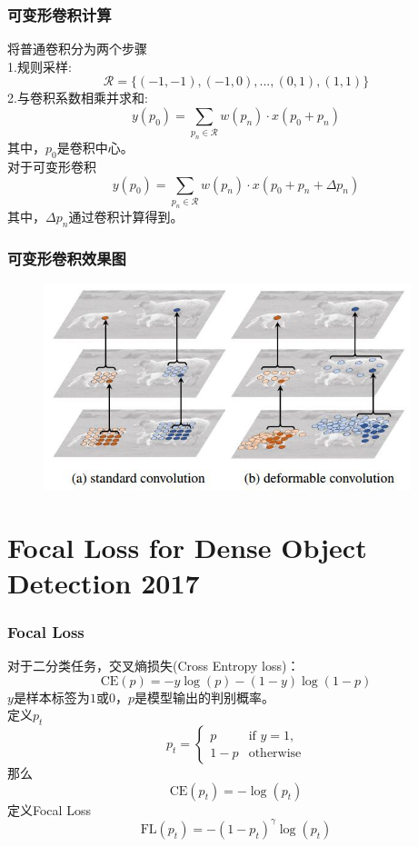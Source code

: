 \documentclass{beamer}
\begin{document}
        \begin{frame}
            \frametitle{可变形卷积计算}
            将普通卷积分为两个步骤 \\
            1.规则采样:
            $$\mathcal{R}=\{(-1,-1),(-1,0),...,(0,1),(1,1)\}$$
            2.与卷积系数相乘并求和:
            $$y(p_0)=\sum_{p_n\in \mathcal{R}}w(p_n)\cdot x(p_0+p_n)$$
            其中，$p_0$是卷积中心。 \\
            \vspace{0.4cm}
            对于可变形卷积
            $$y(p_0)=\sum_{p_n\in \mathcal{R}}w(p_n)\cdot x(p_0+p_n+\Delta p_n)$$
            其中，$\Delta p_n$通过卷积计算得到。
        \end{frame}

        \begin{frame}
            \frametitle{可变形卷积效果图}
            \begin{figure}
                \includegraphics[height=6cm]{../graphic/dfconvvalid.jpg}
            \end{figure}
        \end{frame}

        \section{Focal Loss for Dense Object Detection 2017}
        \begin{frame}
            \frametitle{Focal Loss}
            对于二分类任务，交叉熵损失(Cross Entropy loss)：
            $$\text{CE}(p)=-y\log(p)-(1-y)\log(1-p)$$
            $y$是样本标签为$1$或$0$，$p$是模型输出的判别概率。 \\
            \vspace{0.4cm}
            定义$p_t$
            $$p_t=\begin{cases} p &\text{if } y=1, \\ 1-p &\text{otherwise}\end{cases}$$
            那么
            $$\text{CE}(p_t)=-\log(p_t)$$
            定义Focal Loss
            $$\text{FL}(p_t)=-(1-p_t)^\gamma \log(p_t)$$
        \end{frame}
        
\end{document}
